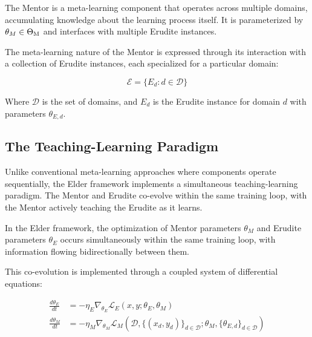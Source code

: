 \begin{definition}[Mentor]
The Mentor is a meta-learning component that operates across multiple domains, accumulating knowledge about the learning process itself. It is parameterized by $\theta_M \in \Theta_{\text{M}}$ and interfaces with multiple Erudite instances.
\end{definition}

The meta-learning nature of the Mentor is expressed through its interaction with a collection of Erudite instances, each specialized for a particular domain:

\begin{equation}
\mathcal{E} = \{E_d : d \in \mathcal{D}\}
\end{equation}

Where $\mathcal{D}$ is the set of domains, and $E_d$ is the Erudite instance for domain $d$ with parameters $\theta_{E,d}$.

\subsection{The Teaching-Learning Paradigm}

Unlike conventional meta-learning approaches where components operate sequentially, the Elder framework implements a simultaneous teaching-learning paradigm. The Mentor and Erudite co-evolve within the same training loop, with the Mentor actively teaching the Erudite as it learns.

\begin{proposition}
In the Elder framework, the optimization of Mentor parameters $\theta_M$ and Erudite parameters $\theta_E$ occurs simultaneously within the same training loop, with information flowing bidirectionally between them.
\end{proposition}

This co-evolution is implemented through a coupled system of differential equations:

\begin{equation}
\begin{aligned}
\frac{d\theta_E}{dt} &= -\eta_E \nabla_{\theta_E} \mathcal{L}_E(x, y; \theta_E, \theta_M) \\
\frac{d\theta_M}{dt} &= -\eta_M \nabla_{\theta_M} \mathcal{L}_M(\mathcal{D}, \{(x_d, y_d)\}_{d \in \mathcal{D}}; \theta_M, \{\theta_{E,d}\}_{d \in \mathcal{D}})
\end{aligned}
\end{equation}

